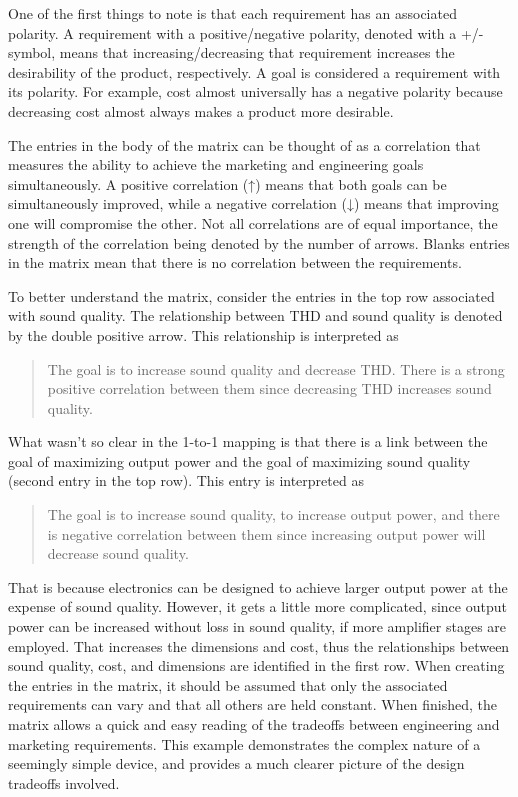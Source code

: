 One of the first things to note is that each requirement has an
associated polarity. A requirement with a positive/negative polarity,
denoted with a +/- symbol, means that increasing/decreasing that
requirement increases the desirability of the product, respectively. A
goal is considered a requirement with its polarity. For example, cost
almost universally has a negative polarity because decreasing cost
almost always makes a product more desirable.

The entries in the body of the matrix can be thought of as a correlation
that measures the ability to achieve the marketing and engineering goals
simultaneously. A positive correlation (↑) means that both goals can be
simultaneously improved, while a negative correlation (↓) means that
improving one will compromise the other. Not all correlations are of
equal importance, the strength of the correlation being denoted by the
number of arrows. Blanks entries in the matrix mean that there is no
correlation between the requirements.

To better understand the matrix, consider the entries in the top row
associated with sound quality. The relationship between THD and sound
quality is denoted by the double positive arrow. This relationship is
interpreted as

\begin{quote}
The goal is to increase sound quality and decrease THD. There is a
strong positive correlation between them since decreasing THD increases
sound quality.
\end{quote}

What wasn't so clear in the 1-to-1 mapping is that there is a link
between the goal of maximizing output power and the goal of maximizing
sound quality (second entry in the top row). This entry is interpreted
as

\begin{quote}
The goal is to increase sound quality, to increase output power, and
there is negative correlation between them since increasing output power
will decrease sound quality.
\end{quote}

That is because electronics can be designed to achieve larger output
power at the expense of sound quality. However, it gets a little more
complicated, since output power can be increased without loss in sound
quality, if more amplifier stages are employed. That increases the
dimensions and cost, thus the relationships between sound quality, cost,
and dimensions are identified in the first row. When creating the
entries in the matrix, it should be assumed that only the associated
requirements can vary and that all others are held constant. When
finished, the matrix allows a quick and easy reading of the tradeoffs
between engineering and marketing requirements. This example
demonstrates the complex nature of a seemingly simple device, and
provides a much clearer picture of the design tradeoffs involved.

